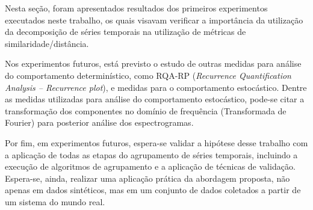 Nesta seção, foram apresentados resultados dos primeiros experimentos executados neste trabalho, os quais visavam verificar a importância da utilização da decomposição de séries temporais na utilização de métricas de similaridade/distância. 

Nos experimentos futuros, está previsto o estudo de outras medidas para análise do comportamento determinístico, como RQA-RP (\emph{Recurrence Quantification Analysis -- Recurrence plot}), e medidas para o comportamento estocástico. Dentre as medidas utilizadas para análise do comportamento estocástico, pode-se citar a transformação dos componentes no domínio de frequência (Transformada de Fourier) para posterior análise dos espectrogramas.

Por fim, em experimentos futuros, espera-se validar a hipótese desse trabalho com a aplicação de todas as etapas do agrupamento de séries temporais, incluindo a execução de algoritmos de agrupamento e a aplicação de técnicas de validação. Espera-se, ainda, realizar uma aplicação prática da abordagem proposta, não apenas em dados sintéticos, mas em um conjunto de dados coletados a partir de um sistema do mundo real.



 


